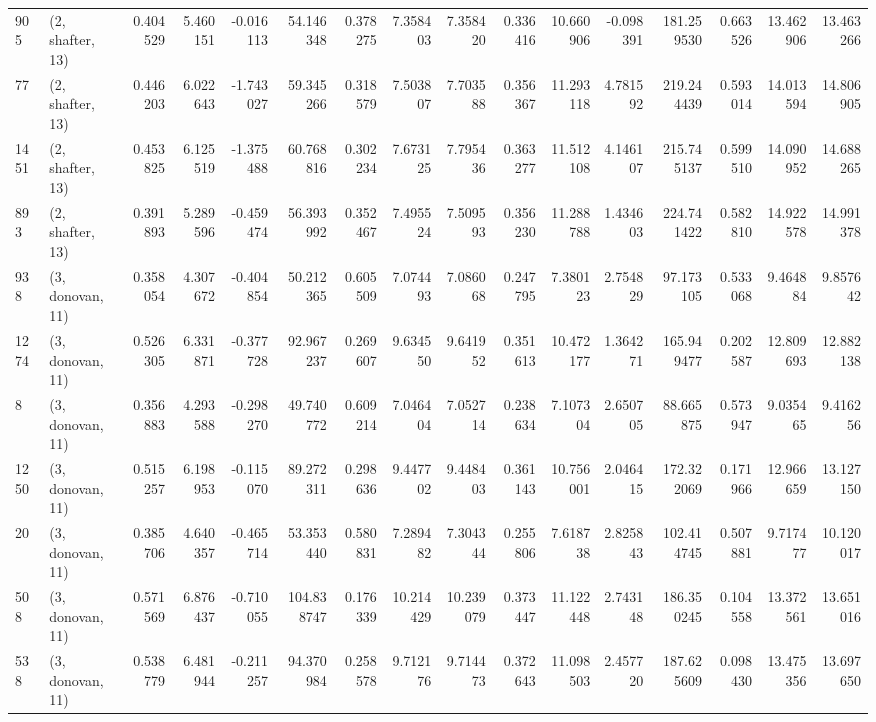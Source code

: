 \begin{tabular}{llrrrrrrrrrrrrrr}
905  &  (2, shafter, 13) &   0.404529 &   5.460151 &  -0.016113 &     54.146348 &    0.378275 &    7.358403 &    7.358420 &  0.336416 &  10.660906 &  -0.098391 &   181.259530 &   0.663526 &  13.462906 &  13.463266 \\
77   &  (2, shafter, 13) &   0.446203 &   6.022643 &  -1.743027 &     59.345266 &    0.318579 &    7.503807 &    7.703588 &  0.356367 &  11.293118 &   4.781592 &   219.244439 &   0.593014 &  14.013594 &  14.806905 \\
1451 &  (2, shafter, 13) &   0.453825 &   6.125519 &  -1.375488 &     60.768816 &    0.302234 &    7.673125 &    7.795436 &  0.363277 &  11.512108 &   4.146107 &   215.745137 &   0.599510 &  14.090952 &  14.688265 \\
893  &  (2, shafter, 13) &   0.391893 &   5.289596 &  -0.459474 &     56.393992 &    0.352467 &    7.495524 &    7.509593 &  0.356230 &  11.288788 &   1.434603 &   224.741422 &   0.582810 &  14.922578 &  14.991378 \\
938  &  (3, donovan, 11) &   0.358054 &   4.307672 &  -0.404854 &     50.212365 &    0.605509 &    7.074493 &    7.086068 &  0.247795 &   7.380123 &   2.754829 &    97.173105 &   0.533068 &   9.464884 &   9.857642 \\
1274 &  (3, donovan, 11) &   0.526305 &   6.331871 &  -0.377728 &     92.967237 &    0.269607 &    9.634550 &    9.641952 &  0.351613 &  10.472177 &   1.364271 &   165.949477 &   0.202587 &  12.809693 &  12.882138 \\
8    &  (3, donovan, 11) &   0.356883 &   4.293588 &  -0.298270 &     49.740772 &    0.609214 &    7.046404 &    7.052714 &  0.238634 &   7.107304 &   2.650705 &    88.665875 &   0.573947 &   9.035465 &   9.416256 \\
1250 &  (3, donovan, 11) &   0.515257 &   6.198953 &  -0.115070 &     89.272311 &    0.298636 &    9.447702 &    9.448403 &  0.361143 &  10.756001 &   2.046415 &   172.322069 &   0.171966 &  12.966659 &  13.127150 \\
20   &  (3, donovan, 11) &   0.385706 &   4.640357 &  -0.465714 &     53.353440 &    0.580831 &    7.289482 &    7.304344 &  0.255806 &   7.618738 &   2.825843 &   102.414745 &   0.507881 &   9.717477 &  10.120017 \\
508  &  (3, donovan, 11) &   0.571569 &   6.876437 &  -0.710055 &    104.838747 &    0.176339 &   10.214429 &   10.239079 &  0.373447 &  11.122448 &   2.743148 &   186.350245 &   0.104558 &  13.372561 &  13.651016 \\
538  &  (3, donovan, 11) &   0.538779 &   6.481944 &  -0.211257 &     94.370984 &    0.258578 &    9.712176 &    9.714473 &  0.372643 &  11.098503 &   2.457720 &   187.625609 &   0.098430 &  13.475356 &  13.697650 \\

\end{tabular}
